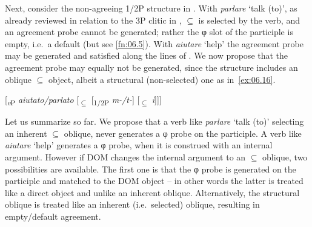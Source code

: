 \documentclass[output=paper]{langsci/langscibook}
\begin{document}
\ea%
    \label{ex:06.14-2}
\z

Next, consider the non-agreeing 1/2P structure in . With
\emph{parlare} ‘talk (to)’, as already reviewed in relation to the 3P clitic in
, ${\subseteq}$ is selected by the verb, and an agreement probe
cannot be generated; rather the φ slot of the participle is empty, i.e.\ a
default (but see \cref{fn:06.5}). With \emph{aiutare} ‘help’ the agreement
probe may be generated and satisfied along the lines of . We now
propose that the agreement probe may equally not be generated, since the
structure includes an oblique ${\subseteq}$ object, albeit a structural
(non-selected) one as in~\eqref{ex:06.16}.

\ea%
    \label{ex:06.15}
    [\textsubscript{\emph{v}P} \emph{aiutato/parlato} [\textsubscript{${\subseteq}$} [\textsubscript{1/2P} \emph{m-/t-}] [\textsubscript{${\subseteq}$} \emph{i}]]]
\z

Let us summarize so far. We propose that a verb like \emph{parlare} ‘talk (to)’
selecting an inherent ${\subseteq}$ oblique, never generates a φ probe on the
participle. A verb like \emph{aiutare} ‘help’ generates a φ probe, when it is
construed with an internal argument. However if \gls{DOM} changes the internal
argument to an ${\subseteq}$ oblique, two possibilities are available. The
first one is that the φ probe is generated on the participle and matched to the
DOM object – in other words the latter is treated like a direct object and
unlike an inherent oblique.  Alternatively, the structural oblique is treated
like an inherent (i.e.\  selected) oblique, resulting in empty/default
agreement.
\end{document}
